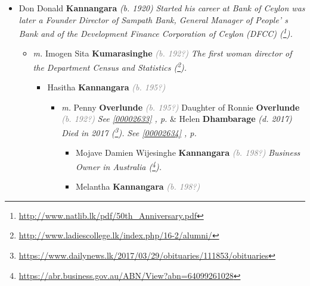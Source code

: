\documentclass[10pt, openany]{book}
\begin{document}
\begin{itemize}
{\begin{itemize}
{\begin{itemize}
{\begin{itemize}
{{{Died in 2019 (\footnote{\url{http://www.dailynews.lk/2019/05/15/obituaries/185673/obituaries}}).
National Library (\footnote{\url{http://www.natlib.lk/pdf/50th_Anniversary.pdf}}).}}
\begin{itemize}
\item{\textcolor{slteal}{\textit{See  \autoref{couple:00000136:00000438} \textit{, p. \pageref{couple:00000136:00000438} }}}}
\end{itemize}
  }
\item{Don Donald \textbf{Kannangara} \textcolor{slorange}{\textit{(b. 1920)}} \textcolor{slmaroon}{\textit{Started his career at Bank of Ceylon was later a Founder Director of Sampath Bank, General Manager of People' s Bank and of the Development Finance Corporation of Ceylon (DFCC) (\footnote{\url{http://www.natlib.lk/pdf/50th_Anniversary.pdf}}).}}
\begin{itemize}
\item{\textit{m.} Imogen Sita \textbf{Kumarasinghe} \textcolor{gray}{\textit{(b. 192?)}} \textcolor{slmaroon}{\textit{The first woman director of the Department Census and Statistics (\footnote{\url{http://www.ladiescollege.lk/index.php/16-2/alumni/}}).}}   \label{couple:00000402:00000499} \begin{itemize}
\item{Hasitha \textbf{Kannangara} \textcolor{gray}{\textit{(b. 195?)}}
\begin{itemize}
\item{\textit{m.} Penny \textbf{Overlunde} \textcolor{gray}{\textit{(b. 195?)}} Daughter of  Ronnie \textbf{Overlunde} \textcolor{gray}{\textit{(b. 192?)}} \textcolor{slteal}{\textit{See  \autoref{00002633} \textit{, p. \pageref{00002633} }}}  \&  Helen \textbf{Dhambarage} \textcolor{slorange}{\textit{(d. 2017)}} \textcolor{slmaroon}{\textit{Died in 2017 (\footnote{\url{https://www.dailynews.lk/2017/03/29/obituaries/111853/obituaries}}).}} \textcolor{slteal}{\textit{See  \autoref{00002634} \textit{, p. \pageref{00002634} }}}   \label{couple:00000432:00000577} \begin{itemize}
\item{Mojave Damien Wijesinghe \textbf{Kannangara} \textcolor{gray}{\textit{(b. 198?)}} \textcolor{slmaroon}{\textit{Business Owner in Australia (\footnote{\url{https://abr.business.gov.au/ABN/View?abn=64099261028}}).}}
   }
\item{Melantha \textbf{Kannangara} \textcolor{gray}{\textit{(b. 198?)}}
}
\end{itemize}}
\end{itemize}}
\end{itemize}}
\end{itemize}}
\end{itemize}}
\end{itemize}}
\end{itemize}}
\end{itemize}
\end{document}
